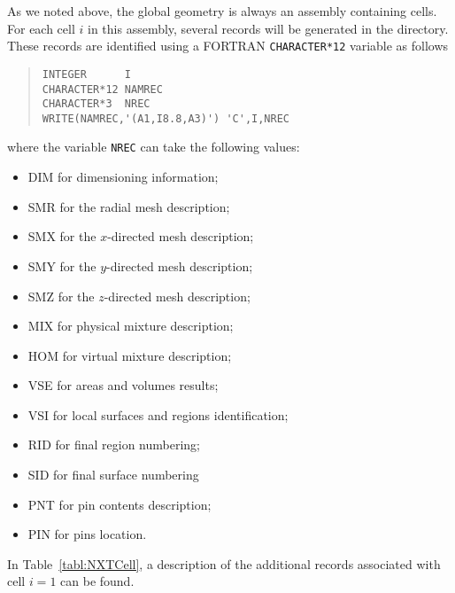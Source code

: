 As we noted above, the global geometry is always an assembly containing cells. For each cell $i$ in this assembly, several records will be generated in the  directory. These records are identified using a FORTRAN \verb|CHARACTER*12| variable as follows 
\begin{quote}
\begin{verbatim}
INTEGER      I
CHARACTER*12 NAMREC
CHARACTER*3  NREC
WRITE(NAMREC,'(A1,I8.8,A3)') 'C',I,NREC
\end{verbatim}
\end{quote}
where the variable \verb|NREC| can take the following values:
\begin{itemize}
\item DIM for dimensioning information;
\item SMR for the radial mesh description;
\item SMX for the $x$-directed mesh description;
\item SMY for the $y$-directed mesh description;
\item SMZ for the $z$-directed mesh description;
\item MIX for physical mixture description;
\item HOM for virtual mixture description;
\item VSE for areas and volumes results;
\item VSI for local surfaces and regions identification;
\item RID for final region numbering;
\item SID for final surface numbering
\item PNT for pin contents description;
\item PIN for pins location.
\end{itemize}

In Table~\ref{tabl:NXTCell}, a description of the  additional  records associated with cell $i=1$ can be found.

